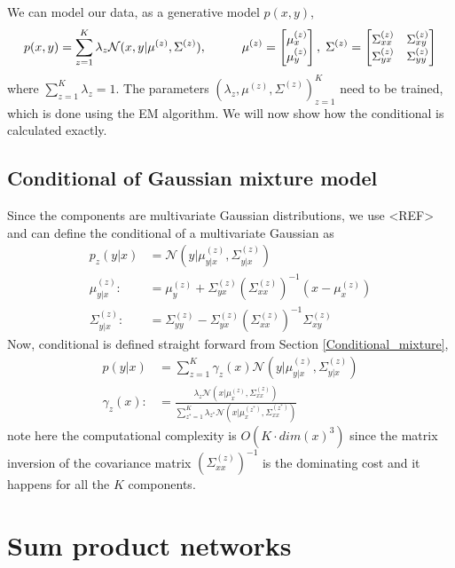 We can model our data, as a generative model $p(x,y)$, 
$$p(x,y)= \sum_{z=1}^K \lambda_z \mathcal{N}(x,y|\mu^{(z)},\Sigma^{(z)}), \hspace{1cm}
\mu^{(z)}=\begin{bmatrix} \mu^{(z)}_x \\ \mu^{(z)}_y \end{bmatrix},\hspace{0.1cm} \Sigma^{(z)} =
\begin{bmatrix} \Sigma^{(z)}_{xx} & \Sigma^{(z)}_{xy}\\ \Sigma^{(z)}_{yx}& \Sigma^{(z)}_{yy}
\end{bmatrix}$$ where $\sum_{z=1}^K \lambda_z = 1$. The parameters $\left(\lambda_z,
\mu^{(z)}, \Sigma^{(z)} \right)_{z=1}^K$ need to be trained, which is done using the EM
algorithm. We will now show how the conditional is calculated exactly. 

\subsection{Conditional of Gaussian mixture model}
Since the components are multivariate Gaussian distributions, we use <REF> and can define the
conditional of a multivariate Gaussian as
\begin{align}
    p_z(y|x) &= \mathcal{N}(y|\mu^{(z)}_{y|x},\Sigma^{(z)}_{y|x} )\\
    \mu^{(z)}_{y|x} :&= \mu^{(z)}_y+\Sigma^{(z)}_{yx}(\Sigma^{(z)}_{xx})^{-1}(x-\mu^{(z)}_x)\\
    \Sigma^{(z)}_{y|x} :&= \Sigma^{(z)}_{yy}-\Sigma^{(z)}_{yx}(\Sigma^{(z)}_{xx})^{-1}\Sigma^{(z)}_{xy} 
\end{align}
Now, conditional is defined straight forward from Section \eqref{Conditional_mixture},
\begin{align}
    p(y|x) &= \sum_{z=1}^K \gamma_z(x) \mathcal{N}(y|\mu_{y|x}^{(z)},\Sigma_{y|x}^{(z)} ) \\
    \gamma_z(x) :&=\frac{\lambda_z \mathcal{N}(x|\mu_{x}^{(z)},\Sigma_{xx}^{(z)})}{\sum_{z^*=1}^K \lambda_{z^*}
\mathcal{N}(x|\mu_{x}^{(z^*)},\Sigma_{xx}^{(z^*)})}
\end{align}
note here the computational complexity is $O(K\cdot dim(x)^3)$ since the matrix inversion
of the covariance matrix $(\Sigma^{(z)}_{xx})^{-1}$ is the dominating cost and it happens
for all the $K$ components. 

\section{Sum product networks}

